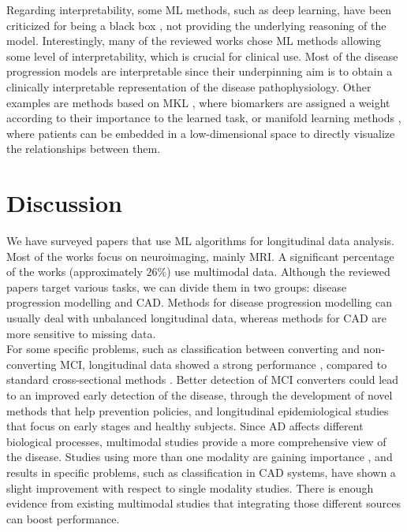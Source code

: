 Regarding interpretability, some ML methods, such as deep learning, have been criticized for being a black box \cite{Ching2018}, not providing the underlying reasoning of the model. Interestingly, many of the reviewed works chose ML methods allowing some level of interpretability, which is crucial for clinical use. Most of the disease progression models are interpretable since their underpinning aim is to obtain a clinically interpretable representation of the disease pathophysiology. Other examples are methods based on MKL \cite{Chen2015,Gonen2011,Zhang2012a}, where biomarkers are assigned a weight according to their importance to the learned task, or manifold learning methods \cite{Guerrero2015,guerrero,Wolz2010}, where patients can be embedded in a low-dimensional space to directly visualize the relationships between them.

\section{Discussion}
\label{sec:conclusion}

We have surveyed papers that use ML algorithms for longitudinal data analysis. Most of the works focus on neuroimaging, mainly MRI. A significant percentage of the works (approximately $26\%$) use multimodal data. Although the reviewed papers target various tasks, we can divide them in two groups: disease progression modelling and CAD. Methods for disease progression modelling can usually deal with unbalanced longitudinal data, whereas methods for CAD are more sensitive to missing data. \\

For some specific problems, such as classification between converting and non-converting MCI, longitudinal data showed a strong performance \cite{Liu2013,Sun2017}, compared to standard cross-sectional methods \cite{cuingnet}. Better detection of MCI converters could lead to an improved early detection of the disease, through the development of novel methods that help prevention policies, and longitudinal epidemiological studies that focus on early stages and healthy subjects. Since AD affects different biological processes, multimodal studies provide a more comprehensive view of the disease. Studies using more than one modality are gaining importance \cite{Chen2015,Chi2017,Hinrichs2011,Minhas2016,Zhang2012a}, and results in specific problems, such as classification in CAD systems, have shown a slight improvement with respect to single modality studies. There is enough evidence from existing multimodal studies \cite{Iturria-Medina2016,Jedynak2012,Oxtoby2018} that integrating those different sources can boost performance. \\

